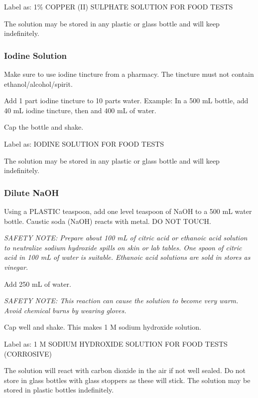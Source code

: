 \noindent Label as: 1\% COPPER (II) SULPHATE SOLUTION FOR FOOD TESTS

\noindent The solution may be stored in any plastic or glass bottle and will keep indefinitely.

\subsubsection{Iodine Solution}
Make sure to use iodine tincture from a pharmacy. The tincture must not contain ethanol\slash alcohol\slash spirit.

\begin{itemize*}
\item Add 1 part iodine tincture to 10 parts water. Example: In a 500 mL bottle, add 40 mL iodine tincture, then and 400 mL of water.
\item Cap the bottle and shake.
\end{itemize*}

\noindent Label as: IODINE SOLUTION FOR FOOD TESTS

\noindent The solution may be stored in any plastic or glass bottle and will keep indefinitely.

\subsubsection{Dilute NaOH}
\begin{itemize*}
\item Using a PLASTIC teaspoon, add one level teaspoon of NaOH to a 500 mL water bottle. Caustic soda (NaOH) reacts with metal. DO NOT TOUCH.

\emph{SAFETY NOTE: Prepare about 100 mL of citric acid or ethanoic acid solution to neutralize sodium hydroxide spills on skin or lab tables. One spoon of citric acid in 100 mL of water is suitable. Ethanoic acid solutions are sold in stores as vinegar.}

\item Add 250 mL of water.

\emph{SAFETY NOTE: This reaction can cause the solution to become very warm. Avoid chemical burns by wearing gloves.}

\item Cap well and shake. This makes 1 M sodium hydroxide solution.
\end{itemize*}

\noindent Label as: 1 M SODIUM HYDROXIDE SOLUTION FOR FOOD TESTS (CORROSIVE)

\noindent The solution will react with carbon dioxide in the air if not well sealed. Do not store in glass bottles with glass stoppers as these will stick. The solution may be stored in plastic bottles indefinitely.


